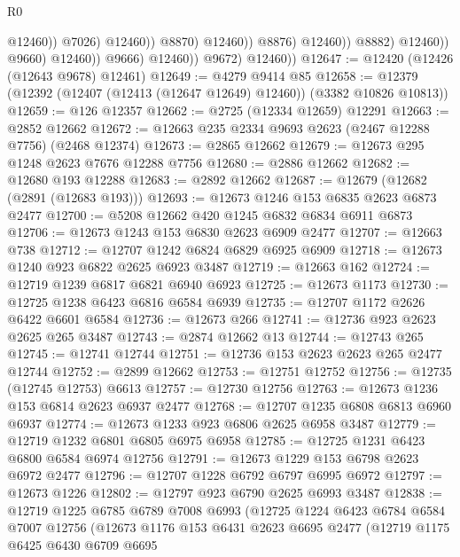 \begin{lexlean}{R0}
\begin{coremodule}
                                                  @12460))
                                              @7026)
                                            @12460))
                                        @8870)
                                      @12460))
                                  @8876)
                                @12460))
                            @8882)
                          @12460))
                      @9660)
                    @12460))
                @9666)
              @12460))
          @9672)
        @12460))
@12647 := @12420 (@12426 (@12643 @9678) @12461)
@12649 := @4279 @9414 @85
@12658 := @12379 (@12392 (@12407 (@12413 (@12647 @12649) @12460)) (@3382 @10826 @10813))
@12659 := @126 @12357
@12662 := @2725 (@12334 @12659) @12291
@12663 := @2852 @12662
@12672 := @12663 @235 @2334 @9693 @2623 (@2467 @12288 @7756) (@2468 @12374)
@12673 := @2865 @12662
@12679 := @12673 @295 @1248 @2623 @7676 @12288 @7756
@12680 := @2886 @12662
@12682 := @12680 @193 @12288
@12683 := @2892 @12662
@12687 := @12679 (@12682 (@2891 (@12683 @193)))
@12693 := @12673 @1246 @153 @6835 @2623 @6873 @2477
@12700 := @5208 @12662 @420 @1245 @6832 @6834 @6911 @6873
@12706 := @12673 @1243 @153 @6830 @2623 @6909 @2477
@12707 := @12663 @738
@12712 := @12707 @1242 @6824 @6829 @6925 @6909
@12718 := @12673 @1240 @923 @6822 @2625 @6923 @3487
@12719 := @12663 @162
@12724 := @12719 @1239 @6817 @6821 @6940 @6923
@12725 := @12673 @1173
@12730 := @12725 @1238 @6423 @6816 @6584 @6939
@12735 := @12707 @1172 @2626 @6422 @6601 @6584
@12736 := @12673 @266
@12741 := @12736 @923 @2623 @2625 @265 @3487
@12743 := @2874 @12662 @13
@12744 := @12743 @265
@12745 := @12741 @12744
@12751 := @12736 @153 @2623 @2623 @265 @2477 @12744
@12752 := @2899 @12662
@12753 := @12751 @12752
@12756 := @12735 (@12745 @12753) @6613
@12757 := @12730 @12756
@12763 := @12673 @1236 @153 @6814 @2623 @6937 @2477
@12768 := @12707 @1235 @6808 @6813 @6960 @6937
@12774 := @12673 @1233 @923 @6806 @2625 @6958 @3487
@12779 := @12719 @1232 @6801 @6805 @6975 @6958
@12785 := @12725 @1231 @6423 @6800 @6584 @6974 @12756
@12791 := @12673 @1229 @153 @6798 @2623 @6972 @2477
@12796 := @12707 @1228 @6792 @6797 @6995 @6972
@12797 := @12673 @1226
@12802 := @12797 @923 @6790 @2625 @6993 @3487
@12838 := @12719
    @1225
    @6785
    @6789
    @7008
    @6993
    (@12725
      @1224
      @6423
      @6784
      @6584
      @7007
      @12756
      (@12673
        @1176
        @153
        @6431
        @2623
        @6695
        @2477
        (@12719
          @1175
          @6425
          @6430
          @6709
          @6695

\end{coremodule}
\end{lexlean}
